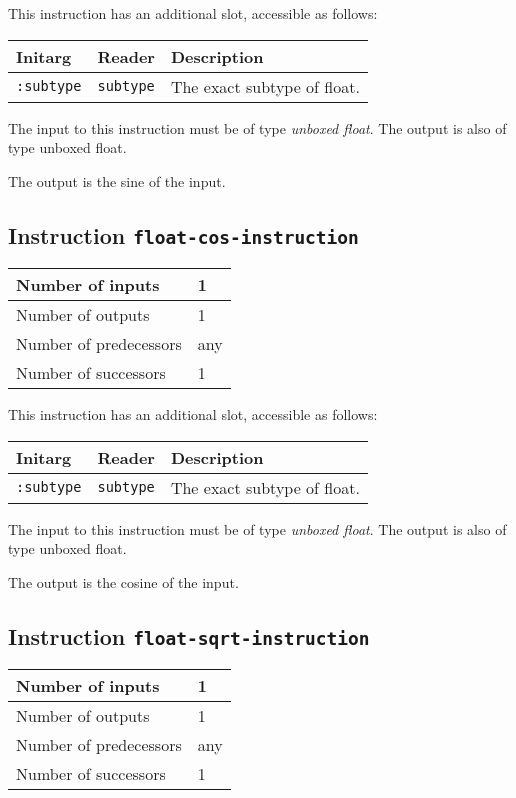 This instruction has an additional slot, accessible as follows:

\begin{tabular}{|l|l|l|}
  \hline
  Initarg & Reader & Description\\
  \hline\hline
  \texttt{:subtype} & \texttt{subtype} & The exact subtype of float.\\
  \hline
\end{tabular}

The input to this instruction must be of type \emph{unboxed
  float}. The output is also of type unboxed float.

The output is the sine of the input.

\subsection{Instruction \texttt{float-cos-instruction}}
\label{hir-instruction-float-div}

\begin{tabular}{|l|l|}
\hline
Number of inputs & 1\\
\hline
Number of outputs & 1\\
\hline
Number of predecessors & any\\
\hline
Number of successors & 1\\
\hline
\end{tabular}

This instruction has an additional slot, accessible as follows:

\begin{tabular}{|l|l|l|}
  \hline
  Initarg & Reader & Description\\
  \hline\hline
  \texttt{:subtype} & \texttt{subtype} & The exact subtype of float.\\
  \hline
\end{tabular}

The input to this instruction must be of type \emph{unboxed
  float}. The output is also of type unboxed float.

The output is the cosine of the input.

\subsection{Instruction \texttt{float-sqrt-instruction}}
\label{hir-instruction-float-div}

\begin{tabular}{|l|l|}
\hline
Number of inputs & 1\\
\hline
Number of outputs & 1\\
\hline
Number of predecessors & any\\
\hline
Number of successors & 1\\
\hline
\end{tabular}

